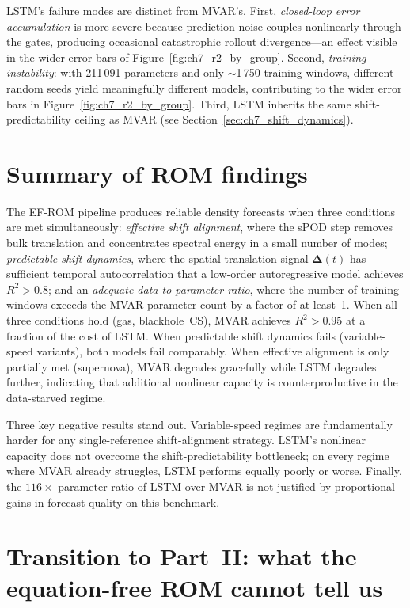 LSTM's failure modes are distinct from MVAR's.  First, \emph{closed-loop
error accumulation} is more severe because prediction noise couples
nonlinearly through the gates, producing occasional catastrophic rollout
divergence---an effect visible in the wider error bars of
Figure~\ref{fig:ch7_r2_by_group}.  Second, \emph{training instability}: with 211\,091 parameters and
only $\sim$1\,750 training windows, different random seeds yield meaningfully
different models, contributing to the wider error bars in
Figure~\ref{fig:ch7_r2_by_group}.  Third, LSTM inherits the same
shift-predictability ceiling as MVAR (see Section~\ref{sec:ch7_shift_dynamics}).

\section{Summary of ROM findings}
\label{sec:ch7_summary}

The EF-ROM pipeline produces reliable density forecasts when three
conditions are met simultaneously:
\emph{effective shift alignment}, where the sPOD step removes bulk
translation and concentrates spectral energy in a small number of modes;
\emph{predictable shift dynamics}, where the spatial translation signal
$\boldsymbol{\Delta}(t)$ has sufficient temporal autocorrelation that
a low-order autoregressive model achieves $R^2>0.8$; and an
\emph{adequate data-to-parameter ratio}, where the number of training
windows exceeds the MVAR parameter count by a factor of at least~1.
When all three conditions hold (gas, blackhole~CS), MVAR achieves
$R^2>0.95$ at a fraction of the cost of LSTM\@.  When predictable shift
dynamics fails (variable-speed variants), both models fail comparably.  When
effective alignment is only partially met (supernova), MVAR degrades gracefully
while LSTM degrades further, indicating that additional nonlinear
capacity is counterproductive in the data-starved regime.

Three key negative results stand out.
Variable-speed regimes are fundamentally harder for any
single-reference shift-alignment strategy.
LSTM's nonlinear capacity does not overcome the shift-predictability
bottleneck; on every regime where MVAR already struggles, LSTM
performs equally poorly or worse.
Finally, the $116\times$ parameter ratio of LSTM over MVAR
is not justified by proportional gains
in forecast quality on this benchmark.

\section{Transition to Part~II: what the equation-free ROM cannot tell us}
\label{sec:ch7_transition}

